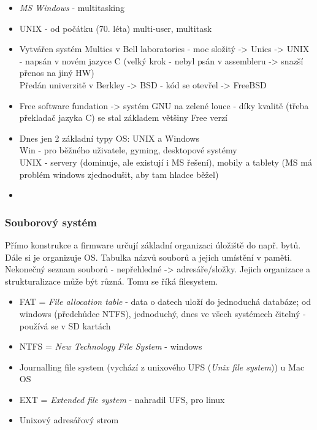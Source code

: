 \documentclass[12pt]{article}
\begin{document}
\begin{itemize}
\item \emph{MS Windows} - multitasking
\item UNIX - od počátku (70. léta) multi-user, multitask
\item Vytvářen systém Multics  v Bell laboratories - moc složitý -> Unics -> UNIX - napsán v novém jazyce C (velký krok - nebyl psán v assembleru -> snazší přenos na jiný HW)\\
Předán univerzitě v Berkley -> BSD - kód se otevřel -> FreeBSD
\item Free software fundation -> systém GNU na zelené louce - díky kvalitě (třeba překladač jazyka C) se stal základem většiny Free verzí
\item Dnes jen 2 základní typy OS: UNIX a Windows\\
Win - pro běžného uživatele, gyming, desktopové systémy\\
UNIX - servery (dominuje, ale existují i MS řešení), mobily a tablety (MS má problém windows zjednodušit, aby tam hladce běžel)
\item
\end{itemize}

\subsubsection{Souborový systém}
Přímo konstrukce a firmware určují základní organizaci úložiště do např. bytů. Dále si je organizuje OS. Tabulka názvů souborů a jejich umístění v paměti. Nekonečný seznam souborů - nepřehledné -> adresáře/složky. Jejich organizace a strukturalizace může být různá. Tomu se říká filesystem.
\begin{itemize}
\item FAT  = \emph{File allocation table} - data o datech uloží do jednoduchá databáze; od windows (předchůdce NTFS), jednoduchý, dnes ve všech systémech čitelný - používá se v SD kartách
\item NTFS = \emph{New Technology File System} - windows
\item Journalling file system (vychází z unixového UFS (\emph{Unix file system})) u Mac OS
\item EXT = \emph{Extended file system} - nahradil  UFS, pro linux
\item Unixový adresářový strom
\end{itemize}
\end{document}
